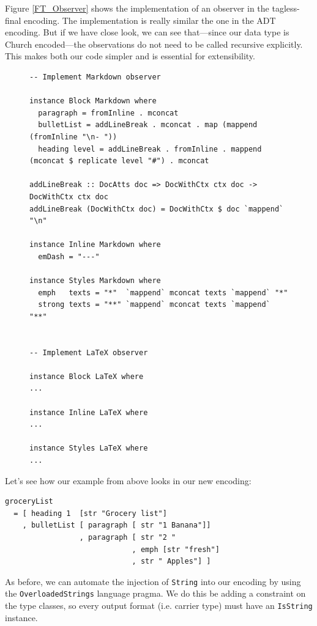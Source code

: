 Figure \ref{FT_Observer} shows the implementation of an observer in the
tagless-final encoding. The implementation is really similar the one in the ADT
encoding. But if we have close look, we can see that—since our data type is
Church encoded—the observations do not need to be called recursive explicitly. This
makes both our code simpler and is essential for extensibility.

\begin{figure}
\begin{lstlisting}
-- Implement Markdown observer

instance Block Markdown where
  paragraph = fromInline . mconcat
  bulletList = addLineBreak . mconcat . map (mappend (fromInline "\n- "))
  heading level = addLineBreak . fromInline . mappend (mconcat $ replicate level "#") . mconcat

addLineBreak :: DocAtts doc => DocWithCtx ctx doc -> DocWithCtx ctx doc
addLineBreak (DocWithCtx doc) = DocWithCtx $ doc `mappend` "\n"

instance Inline Markdown where
  emDash = "---"

instance Styles Markdown where
  emph   texts = "*"  `mappend` mconcat texts `mappend` "*"
  strong texts = "**" `mappend` mconcat texts `mappend` "**"


-- Implement LaTeX observer

instance Block LaTeX where
...

instance Inline LaTeX where
...

instance Styles LaTeX where
...
\end{lstlisting}
\end{figure}


\clearpage

Let's see how our example from above looks in our new encoding:

\begin{lstlisting}
groceryList
  = [ heading 1  [str "Grocery list"]
    , bulletList [ paragraph [ str "1 Banana"]]
                 , paragraph [ str "2 "
                             , emph [str "fresh"]
                             , str " Apples"] ]
\end{lstlisting}


As before, we can automate the injection of \texttt{String} into our encoding by
using the \texttt{OverloadedStrings} language pragma. We do this be adding a
constraint on the type classes, so every output format (i.e. carrier type) must
have an \texttt{IsString} instance.

